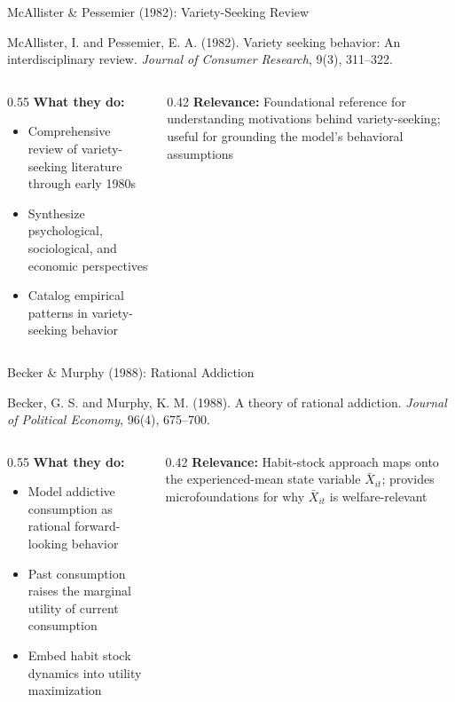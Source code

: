 \documentclass[aspectratio=169,professionalfonts]{beamer}
\newcommand{\hl}[1]{\textbf{\textcolor{UGARed}{#1}}}
\begin{document}
\begin{frame}{McAllister \& Pessemier (1982): Variety-Seeking Review}
  \begin{tcolorbox}[colback=red!5!white, colframe=UGARed, title=\textbf{Citation}]
    McAllister, I. and Pessemier, E. A. (1982). Variety seeking behavior: An
    interdisciplinary review. \textit{Journal of Consumer Research}, 9(3), 311--322.
  \end{tcolorbox}
  \vspace{6pt}
  \begin{columns}[T]
    \begin{column}{0.55\textwidth}
      \hl{What they do:}
      \begin{itemize}
        \item Comprehensive review of variety-seeking literature through early 1980s
        \item Synthesize psychological, sociological, and economic perspectives
        \item Catalog empirical patterns in variety-seeking behavior
      \end{itemize}
    \end{column}
    \begin{column}{0.42\textwidth}
      \hl{Relevance:} Foundational reference for understanding motivations behind
      variety-seeking; useful for grounding the model's behavioral assumptions
    \end{column}
  \end{columns}
\end{frame}

\begin{frame}{Becker \& Murphy (1988): Rational Addiction}
  \begin{tcolorbox}[colback=red!5!white, colframe=UGARed, title=\textbf{Citation}]
    Becker, G. S. and Murphy, K. M. (1988). A theory of rational addiction.
    \textit{Journal of Political Economy}, 96(4), 675--700.
  \end{tcolorbox}
  \vspace{6pt}
  \begin{columns}[T]
    \begin{column}{0.55\textwidth}
      \hl{What they do:}
      \begin{itemize}
        \item Model addictive consumption as rational forward-looking behavior
        \item Past consumption raises the marginal utility of current consumption
        \item Embed habit stock dynamics into utility maximization
      \end{itemize}
    \end{column}
    \begin{column}{0.42\textwidth}
      \hl{Relevance:} Habit-stock approach maps onto the experienced-mean state variable
      $\bar{X}_{it}$; provides microfoundations for why $\bar{X}_{it}$ is welfare-relevant
    \end{column}
  \end{columns}
\end{frame}
\end{document}
